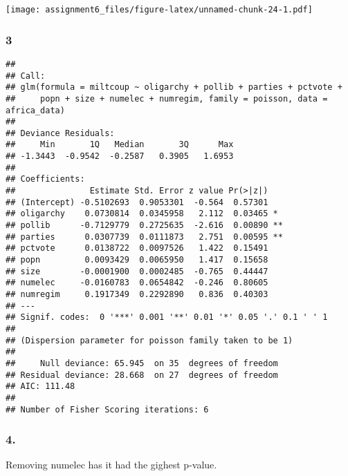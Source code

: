 \documentclass[11pt,]{article}
\newenvironment{Shaded}{\begin{snugshade}}{\end{snugshade}}
\newcommand{\KeywordTok}[1]{\textcolor[rgb]{0.13,0.29,0.53}{\textbf{{#1}}}}
\newcommand{\DataTypeTok}[1]{\textcolor[rgb]{0.13,0.29,0.53}{{#1}}}
\newcommand{\StringTok}[1]{\textcolor[rgb]{0.31,0.60,0.02}{{#1}}}
\newcommand{\CommentTok}[1]{\textcolor[rgb]{0.56,0.35,0.01}{\textit{{#1}}}}
\newcommand{\NormalTok}[1]{{#1}}
\begin{document}
\texttt{[image: assignment6\_files/figure-latex/unnamed-chunk-24-1.pdf]}

\subsubsection{3}\label{section-17}

\begin{Shaded}
\end{Shaded}

\begin{verbatim}
## 
## Call:
## glm(formula = miltcoup ~ oligarchy + pollib + parties + pctvote + 
##     popn + size + numelec + numregim, family = poisson, data = africa_data)
## 
## Deviance Residuals: 
##     Min       1Q   Median       3Q      Max  
## -1.3443  -0.9542  -0.2587   0.3905   1.6953  
## 
## Coefficients:
##               Estimate Std. Error z value Pr(>|z|)   
## (Intercept) -0.5102693  0.9053301  -0.564  0.57301   
## oligarchy    0.0730814  0.0345958   2.112  0.03465 * 
## pollib      -0.7129779  0.2725635  -2.616  0.00890 **
## parties      0.0307739  0.0111873   2.751  0.00595 **
## pctvote      0.0138722  0.0097526   1.422  0.15491   
## popn         0.0093429  0.0065950   1.417  0.15658   
## size        -0.0001900  0.0002485  -0.765  0.44447   
## numelec     -0.0160783  0.0654842  -0.246  0.80605   
## numregim     0.1917349  0.2292890   0.836  0.40303   
## ---
## Signif. codes:  0 '***' 0.001 '**' 0.01 '*' 0.05 '.' 0.1 ' ' 1
## 
## (Dispersion parameter for poisson family taken to be 1)
## 
##     Null deviance: 65.945  on 35  degrees of freedom
## Residual deviance: 28.668  on 27  degrees of freedom
## AIC: 111.48
## 
## Number of Fisher Scoring iterations: 6
\end{verbatim}

\subsubsection{4.}\label{section-18}

Removing numelec has it had the gighest p-value.
\end{document}
